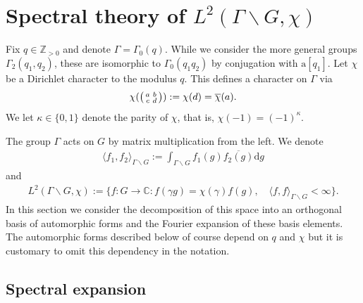 \documentclass[12pt]{amsart}
\theoremstyle{definition}
\theoremstyle{remark}
\numberwithin{equation}{section}
\newcommand{\C}{{\mathbb C}}
\newcommand{\Z}{{\mathbb Z}}
\newcommand{\1}{{\mathbf 1}}
\renewcommand{\a}{\mathrm{a}}
\renewcommand{\d}{\mathrm d}
\begin{document}
\section{Spectral theory of $L^2(\Gamma \backslash G,\chi)$} \label{sec:Spectraltheoryof}

Fix $q \in \Z_{>0}$ and denote $\Gamma = \Gamma_0(q)$. While we consider the more general groups $\Gamma_2(q_1,q_2)$, these are isomorphic to $\Gamma_0(q_1 q_2)$ by conjugation with $\a[q_1]$. Let $\chi$ be a Dirichlet character to the modulus $q$. This defines a character on $\Gamma$ via
\begin{align*}
    \chi(\smqty(a &b \\ c & d)) := \chi(d) = \overline{\chi}(a).
\end{align*}
We let $\kappa\in \{0,1\}$ denote the parity of $\chi$, that is, $\chi(-1) = (-1)^\kappa.$ 

The group $\Gamma$ acts on $G$ by matrix multiplication from the left. We denote 
\begin{align*}
    \langle f_1,f_2 \rangle_{\Gamma \backslash G}:=   \int_{\Gamma \backslash G} f_1(g) \overline{f_2(g)} \d g
\end{align*}
and
\begin{align*}
    L^2(\Gamma \backslash G,\chi) := \{f: G \to \C: f(\gamma g) = \chi(\gamma) f(g), \quad  \langle f,f \rangle_{\Gamma \backslash G} < \infty\}.
\end{align*}
In this section we consider the decomposition of this space into an orthogonal basis of automorphic forms and the Fourier expansion of these basis elements. The automorphic forms described below of course depend on $q$ and $\chi$ but it is customary to omit this dependency in the notation. 


\subsection{Spectral expansion}
\end{document}
